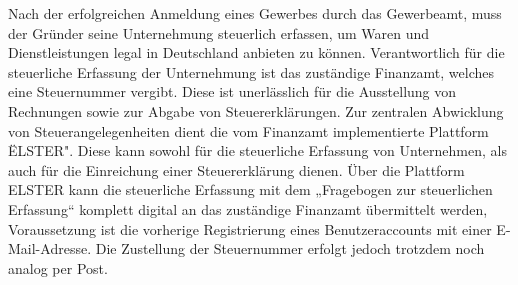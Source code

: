 Nach der erfolgreichen Anmeldung eines Gewerbes durch das Gewerbeamt, muss der Gründer seine Unternehmung steuerlich erfassen, um Waren und Dienstleistungen legal in Deutschland anbieten zu können.
 Verantwortlich für die steuerliche Erfassung der Unternehmung ist das zuständige Finanzamt, welches eine Steuernummer vergibt. Diese ist unerlässlich für die Ausstellung von Rechnungen sowie zur Abgabe von Steuererklärungen. 
 Zur zentralen Abwicklung von Steuerangelegenheiten dient die vom Finanzamt implementierte Plattform \"ELSTER".
 Diese kann sowohl für die steuerliche Erfassung von Unternehmen, als auch für die Einreichung einer Steuererklärung dienen. 
 Über die Plattform ELSTER kann die steuerliche Erfassung mit dem „Fragebogen zur steuerlichen Erfassung“ komplett digital an das zuständige Finanzamt übermittelt werden, Voraussetzung ist die vorherige Registrierung eines Benutzeraccounts mit einer E-Mail-Adresse. 
 Die Zustellung der Steuernummer erfolgt jedoch trotzdem noch analog per Post.
